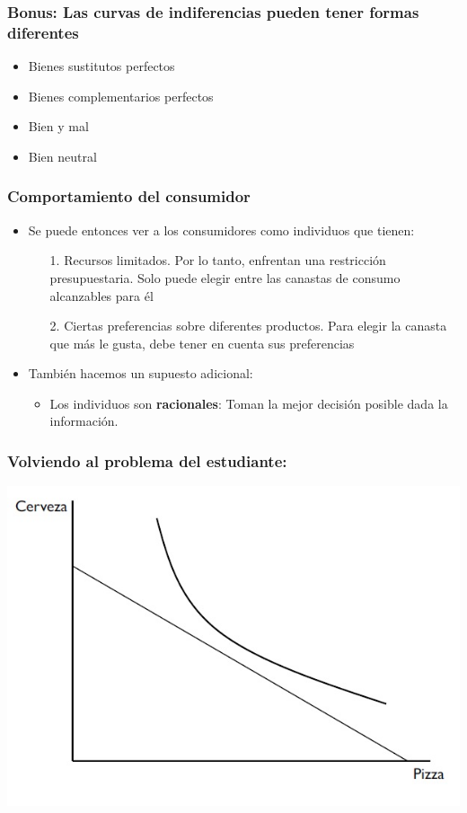 \documentclass{beamer}
\begin{document}
\begin{frame}
\frametitle{Bonus: Las curvas de indiferencias pueden tener formas diferentes}
\begin{itemize}
    \item Bienes sustitutos perfectos %
    \item Bienes complementarios perfectos %
    \item Bien y mal %
    \item Bien neutral %
\end{itemize} 
\end{frame}

\begin{frame}
\frametitle{Comportamiento del consumidor}
\begin{itemize}
    \item Se puede entonces ver a los consumidores como individuos que tienen:
    \begin{itemize}
        \item[1.] Recursos limitados. Por lo tanto, enfrentan una restricción presupuestaria. Solo puede elegir entre las canastas de consumo alcanzables
        para él
        \item[2.] Ciertas preferencias sobre diferentes productos. Para elegir la canasta que más le gusta, debe tener en cuenta
        sus preferencias
    \end{itemize}
    \item También hacemos un supuesto adicional:
    \begin{itemize}
    \item Los individuos son \textbf{racionales}: Toman la mejor decisión posible dada la información.
    \end{itemize}
\end{itemize} 
\end{frame}

\begin{frame}
\frametitle{Volviendo al problema del estudiante:}
\centering
\includegraphics[scale=0.65]{../Figures/Tema_02.18_rp16.jpg}
\end{frame}
\end{document}
